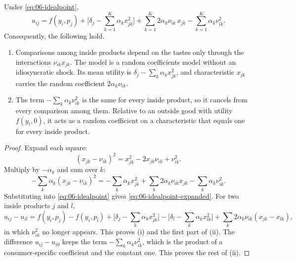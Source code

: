 \begin{proposition}\label{prop:06-idealpoint}
Under \eqref{eq:06-idealpoint},
\begin{equation}\label{eq:06-idealpoint-expanded}
  u_{ij} = f(y_i, p_j) + \Big[\delta_j - \sum_{k=1}^K \alpha_k x_{jk}^2\Big]
           + \sum_{k=1}^K 2\alpha_k\nu_{ik}\, x_{jk} - \sum_{k=1}^K \alpha_k\nu_{ik}^2 .
\end{equation}
Consequently, the following hold.
\begin{enumerate}[label=(\roman*)]
  \item Comparisons among inside products depend on the tastes only through the interactions
        $\nu_{ik}x_{jk}$. The model is a random coefficients model without an idiosyncratic shock. Its mean
        utility is $\delta_j - \sum_k \alpha_k x_{jk}^2$, and characteristic $x_{jk}$ carries the random
        coefficient $2\alpha_k\nu_{ik}$.
  \item The term $-\sum_k \alpha_k\nu_{ik}^2$ is the same for every inside product, so it cancels from
        every comparison among them. Relative to an outside good with utility $f(y_i, 0)$, it acts as a
        random coefficient on a characteristic that equals one for every inside product.
\end{enumerate}
\end{proposition}

\begin{proof}
Expand each square:
\begin{equation*}
  (x_{jk} - \nu_{ik})^2 = x_{jk}^2 - 2x_{jk}\nu_{ik} + \nu_{ik}^2 .
\end{equation*}
Multiply by $-\alpha_k$ and sum over $k$:
\begin{equation*}
  -\sum_k \alpha_k (x_{jk} - \nu_{ik})^2 = -\sum_k \alpha_k x_{jk}^2 + \sum_k 2\alpha_k\nu_{ik}x_{jk}
  - \sum_k \alpha_k\nu_{ik}^2 .
\end{equation*}
Substituting into \eqref{eq:06-idealpoint} gives \eqref{eq:06-idealpoint-expanded}. For two inside
products $j$ and $l$,
\begin{equation*}
  u_{ij} - u_{il} = f(y_i, p_j) - f(y_i, p_l) + \Big[\delta_j - \sum_k \alpha_k x_{jk}^2\Big]
  - \Big[\delta_l - \sum_k \alpha_k x_{lk}^2\Big] + \sum_k 2\alpha_k\nu_{ik}(x_{jk} - x_{lk}),
\end{equation*}
in which $\nu_{ik}^2$ no longer appears. This proves (i) and the first part of (ii). The difference
$u_{ij} - u_{i0}$ keeps the term $-\sum_k \alpha_k\nu_{ik}^2$, which is the product of a consumer-specific
coefficient and the constant one. This proves the rest of (ii).
\end{proof}

